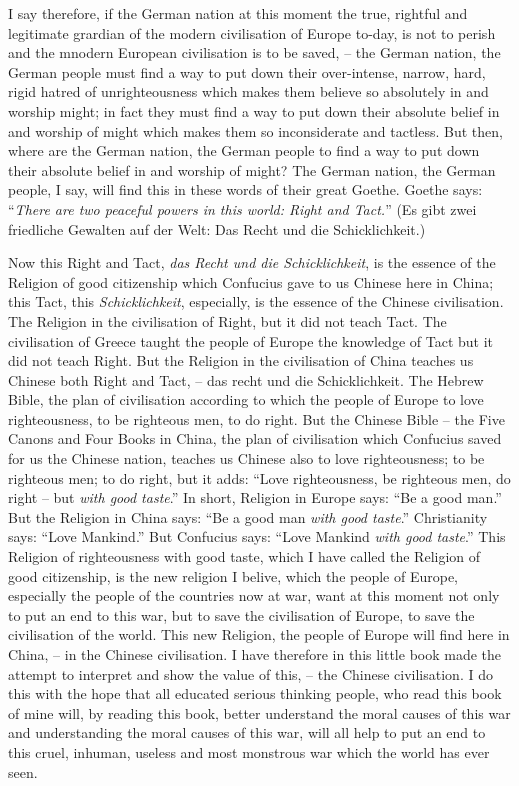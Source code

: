 I say therefore, if the German nation at this moment the true,
rightful and legitimate grardian of the modern civilisation of Europe to-day,
is not to perish and the mnodern European civilisation is to be saved,
-- the German nation, the German people must find a way to put down their over-intense, narrow, hard, rigid hatred of unrighteousness which makes them believe so absolutely in and worship might;
in fact they must find a way to put down their absolute belief in and worship of might which makes them so inconsiderate and tactless.
But then, where are the German nation, the German people to find a way to put down their absolute belief in and worship of might?
The German nation, the German people, I say, will find this in these words of their great Goethe.
Goethe says: ``\emph{There are two peaceful powers in this world: Right and Tact.}'' (Es gibt zwei friedliche Gewalten auf der Welt: Das Recht und die Schicklichkeit.)

Now this Right and Tact, \emph{das Recht und die Schicklichkeit},
is the essence of the Religion of good citizenship which Confucius gave to us Chinese here in China;
this Tact, this \emph{Schicklichkeit}, especially, is the essence of the Chinese civilisation.
The Religion in the civilisation of Right, but it did not teach Tact.
The civilisation of Greece taught the people of Europe the knowledge of Tact but it did not teach Right.
But the Religion in the civilisation of China teaches us Chinese both Right and Tact, -- das recht und die Schicklichkeit.
The Hebrew Bible, the plan of civilisation according to which the people of Europe to love righteousness, to be righteous men, to do right.
But the Chinese Bible -- the Five Canons and Four Books in China,
the plan of civilisation which Confucius saved for us the Chinese nation, teaches us Chinese also to love righteousness;
to be righteous men; to do right, but it adds: ``Love righteousness, be righteous men, do right -- but \emph{with good taste}.''
In short, Religion in Europe says: ``Be a good man.''
But the Religion in China says: ``Be a good man \emph{with good taste}.''
Christianity says: ``Love Mankind.''
But Confucius says: ``Love Mankind \emph{with good taste}.''
This Religion of righteousness with good taste, which I have called the Religion of good citizenship, is the new religion I belive,
which the people of Europe, especially the people of the countries now at war,
want at this moment not only to put an end to this war,
but to save the civilisation of Europe,
to save the civilisation of the world.
This new Religion, the people of Europe will find here in China,
-- in the Chinese civilisation.
I have therefore in this little book made the attempt to interpret and show the value of this,
-- the Chinese civilisation.
I do this with the hope that all educated serious thinking people,
who read this book of mine will, by reading this book, better understand the moral causes of this war and understanding the moral causes of this war,
will all help to put an end to this cruel, inhuman, useless and most monstrous war which the world has ever seen.

